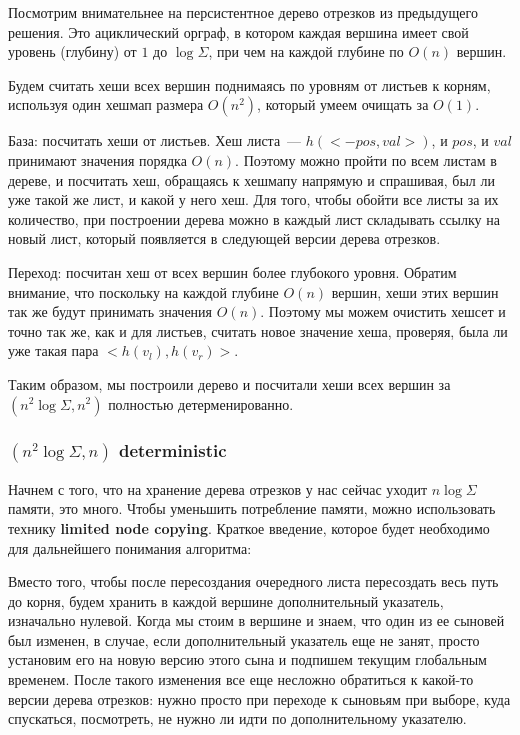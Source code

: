 {Посмотрим внимательнее на персистентное дерево отрезков из предыдущего решения. Это ациклический орграф, в котором каждая вершина имеет свой уровень (глубину) от $1$ до $\log \Sigma$, при чем на каждой глубине по $O(n)$ вершин.

Будем считать хеши всех вершин поднимаясь по уровням от листьев к корням, используя один хешмап размера $O(n^2)$, который умеем очищать за $O(1)$.

База: посчитать хеши от листьев. Хеш листа~--- $h(<-pos, val>)$, и $pos$, и $val$ принимают значения порядка $O(n)$. Поэтому можно пройти по всем листам в дереве, и посчитать хеш, обращаясь к хешмапу напрямую и спрашивая, был ли уже такой же лист, и какой у него хеш. Для того, чтобы обойти все листы за их количество, при построении дерева можно в каждый лист складывать ссылку на новый лист, который появляется в следующей версии дерева отрезков.

Переход: посчитан хеш от всех вершин более глубокого уровня. Обратим внимание, что поскольку на каждой глубине $O(n)$ вершин, хеши этих вершин так же будут принимать значения $O(n)$. Поэтому мы можем очистить хешсет и точно так же, как и для листьев, считать новое значение хеша, проверяя, была ли уже такая пара $<h(v_l), h(v_r)>$.

Таким образом, мы построили дерево и посчитали хеши всех вершин за $(n^2 \log \Sigma, n^2)$ полностью детерменированно.


\subsubsection{$(n^2 \log \Sigma, n)$ deterministic}

Начнем с того, что на хранение дерева отрезков у нас сейчас уходит $n \log \Sigma$ памяти, это много. Чтобы уменьшить потребление памяти, можно использовать технику \textbf{limited node copying}. Краткое введение, которое будет необходимо для дальнейшего понимания алгоритма:

Вместо того, чтобы после пересоздания очередного листа пересоздать весь путь до корня, будем хранить в каждой вершине дополнительный указатель, изначально нулевой. Когда мы стоим в вершине и знаем, что один из ее сыновей был изменен, в случае, если дополнительный указатель еще не занят, просто установим его на новую версию этого сына и подпишем текущим глобальным временем. После такого изменения все еще несложно обратиться к какой-то версии дерева отрезков: нужно просто при переходе к сыновьям при выборе, куда спускаться, посмотреть, не нужно ли идти по дополнительному указателю.

}

